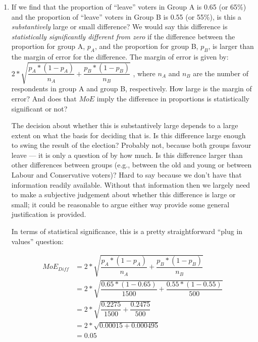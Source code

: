 \documentclass[a4paper]{exam}
\begin{document}
\begin{enumerate}
\begin{enumerate}
\begin{solution}
	\end{solution}
	
	\item If we find that the proportion of ``leave'' voters in Group A is 0.65 (or 65\%) and the proportion of ``leave'' voters in Group B is 0.55 (or 55\%), is this a \textit{substantively} large or small difference? We would say this difference is \textit{statistically significantly different from zero} if the difference between the proportion for group A, $p_A$, and the proportion for group B, $p_B$, is larger than the margin of error for the difference. The margin of error is given by: $2*\sqrt{ \dfrac{p_A * (1-p_A)}{n_A} + \dfrac{p_B * (1-p_B)}{n_B} }$ , where $n_A$ and $n_B$ are the number of respondents in group A and group B, respectively. How large is the margin of error? And does that $MoE$ imply the difference in proportions is statistically significant or not?
	
	\begin{solution}
	
	The decision about whether this is substantively large depends to a large extent on what the basis for deciding that is. Is this difference large enough to swing the result of the election? Probably not, because both groups favour leave --- it is only a question of by how much. Is this difference larger than other differences between groups (e.g., between the old and young or between Labour and Conservative voters)? Hard to say because we don't have that information readily available. Without that information then we largely need to make a subjective judgement about whether this difference is large or small; it could be reasonable to argue either way provide some general justification is provided.
	
	In terms of statistical significance, this is a pretty straightforward ``plug in values'' question:
	
	\begin{align*}
	MoE_{Diff} & = 2*\sqrt{ \dfrac{p_A * (1-p_A)}{n_A} + \dfrac{p_B * (1-p_B)}{n_B} } \\
	           & = 2*\sqrt{ \dfrac{0.65 * (1-0.65)}{1500} + \dfrac{0.55 * (1-0.55)}{500} } \\
	           & = 2*\sqrt{ \dfrac{0.2275}{1500} + \dfrac{0.2475}{500} } \\
	           & = 2*\sqrt{ 0.00015 + 0.000495 } \\
	           & = 0.05 \\
	\end{align*}
	

\end{solution}
\end{enumerate}
\end{enumerate}
\end{document}
